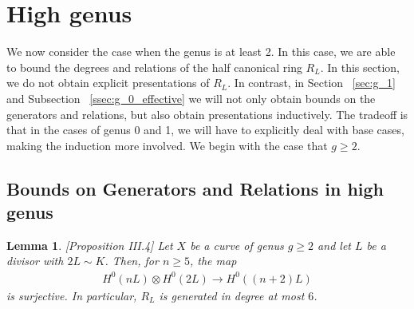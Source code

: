 \documentclass{amsart}
\theoremstyle{plain}
\newtheorem{lem}[thm]{Lemma}
\theoremstyle{definition}
\theoremstyle{remark}
\numberwithin{equation}{section}
\newcommand\ssec{\subsection}
\newcommand\im{\text{im }}
\begin{document}

\section{High genus}
\label{sec:g_high}
We now consider the case when the genus is at least 2. In this case, we are able to bound the degrees and relations of the half canonical ring $R_L$. In this section, we do not obtain explicit presentations of $R_L.$ In contrast, in Section ~\ref{sec:g_1} and Subsection ~\ref{ssec:g_0_effective} we will not only obtain bounds on the generators and relations, but also obtain presentations inductively. The tradeoff is that in the cases of genus 0 and 1, we will have to explicitly deal with base cases, making the induction more involved. We begin with the case that $g \geq 2$.

\ssec{Bounds on Generators and Relations in high genus}

\begin{lem}
\label{lem:semicanonical_generation} \cite{neves:halfcan}[Proposition III.4]
Let $X$ be a curve of genus $g \geq 2$ and let $L$ be a divisor with $2 L \sim K$. Then, for $n \geq 5$, the map
\begin{align*}
	H^0(nL) \otimes H^0(2L) \rightarrow H^0((n+2)L)
\end{align*}
is surjective.
In particular, $R_L$ is generated in degree at most $6$.
\end{lem}

\end{document}
